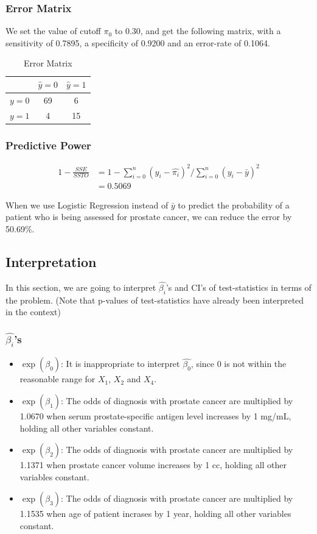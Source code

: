 \documentclass[a4paper,11pt,onecolumn,twoside]{article}
\begin{document}
\subsubsection{Error Matrix}
We set the value of cutoff $\pi_{0}$ to $0.30$, and get the following matrix, with a sensitivity of 0.7895, a specificity of 0.9200 and an error-rate of 0.1064.
\begin{table}[H]
	\centering
	\begin{tabular}{ccc}
		\midrule[1.5pt]
		&$\hat{y}=0$&$\hat{y}=1$\\
		\hline 
		$y=0$& 69&  6\\
		$y=1$& 4&  15\\
		\midrule[1.5pt]
	\end{tabular}
	\caption{Error Matrix}
\end{table}

\subsubsection{Predictive Power}
\begin{equation}
\begin{aligned}
1-\frac{SSE}{SSTO}& = 1-\sum_{i=0}^{n}(y_{i}-\hat{\pi_{i}})^{2}/\sum_{i=0}^{n}(y_{i}-\bar{y})^{2}\\
&= 0.5069
\end{aligned}
\end{equation}
\par
When we use Logistic Regression  instead of $\bar{y}$ to predict the probability of a patient who is being assessed for prostate cancer, we can reduce the error by 50.69$\%$.\par
\subsection{Interpretation}
In this section, we are going to interpret $\hat{\beta_{i}}$'s and CI's of test-statistics in terms of the problem. (Note that p-values of test-statistics have already been interpreted in the context)\par
\subsubsection{$\hat{\beta_{i}}$'s}
\begin{itemize}
	\item $\exp(\hat{\beta_{0}})$: It is inappropriate to interpret $\hat{\beta_{0}}$, since 0 is not within the reasonable range for $X_{1}$, $X_{2}$ and $X_{4}$.
	\item $\exp(\hat{\beta_{1}})$: The odds of diagnosis with prostate cancer are multiplied by 1.0670 when serum prostate-specific antigen level increases by 1 mg/mL, holding all other variables constant.
	\item $\exp(\hat{\beta_{2}})$: The odds of diagnosis with prostate cancer are multiplied by 1.1371 when prostate cancer volume increases by 1 cc, holding all other variables constant.
	\item $\exp(\hat{\beta_{3}})$: The odds of diagnosis with prostate cancer are multiplied by 1.1535 when age of patient incrases by 1 year, holding all other variables constant.
\end{itemize}
\end{document}
